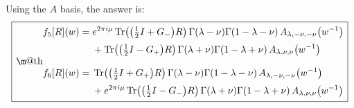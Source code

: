\documentclass[11pt]{article}
\makeatletter
\newcommand*{\wideboxed}[1]{\setlength{\fboxsep}{1ex}%
  \fbox{\m@th$\displaystyle#1$}}
\newcommand*{\bra}[1]{\langle{#1}|}
\newcommand*{\ket}[1]{|{#1}\rangle}
\DeclareMathOperator{\Tr}{Tr}
\newcommand{\rar}{{\rightarrow}}
\newcommand{\IN}{\text{in}}
\newcommand{\OUT}{\text{out}}
\makeatother
\begin{document}
Using the $A$ basis, the answer is:
\begin{equation}\label{tpf-56}
\wideboxed{
\begin{aligned}
f_{5}[R](w)&=\begin{aligned}[t]
&e^{2\pi i\mu} \Tr \bigl(\bigl( \tfrac{1}{2}I+G_{-} \bigr)R \bigr)\,
\Gamma(\lambda-\nu)\Gamma(1-\lambda-\nu)\,A_{\lambda,-\nu,-\nu}\big(w^{-1}\big)
\\[2pt]
&+\Tr\bigl(\bigl(\tfrac{1}{2}I-G_{+}\bigr)R \bigr)\,
\Gamma(\lambda+\nu)\Gamma(1-\lambda+\nu)\,A_{\lambda,\nu,\nu}\big(w^{-1}\big)
\end{aligned}
\\[8pt]
f_{6}[R](w)&=\begin{aligned}[t]
&\Tr\bigl(\bigl(\tfrac{1}{2}I+G_{+}\bigr)R \bigr)\,
\Gamma(\lambda-\nu)\Gamma(1-\lambda-\nu)\,A_{\lambda,-\nu,-\nu}\big(w^{-1}\big)
\\[2pt]
&+e^{2\pi i\mu} \Tr\bigl(\bigl(\tfrac{1}{2}I-G_{-}\bigr)R \bigr)\,
\Gamma(\lambda+\nu)\Gamma(1-\lambda+\nu)\,A_{\lambda,\nu,\nu}\big(w^{-1}\big)
\end{aligned}
\end{aligned}
}
\end{equation}
\end{document}
